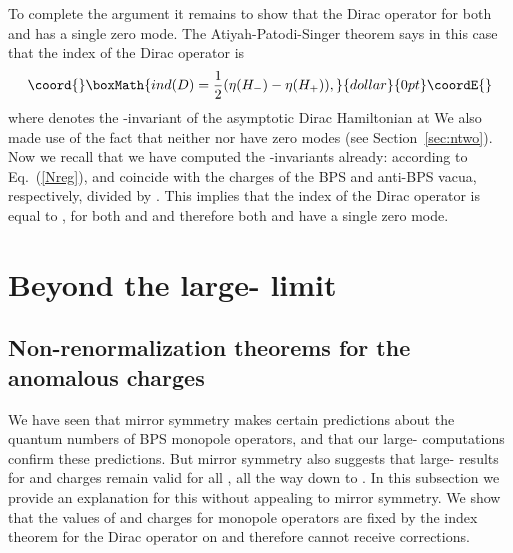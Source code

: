 \documentclass[a4paper,12pt, amsfonts, amssymb]{article}
\providecommand{\RR}{{\mathbb R}}
\renewcommand{\SS}{{\mathbb S}}
\providecommand{\ra}{\rightarrow}
\providecommand{\tpsi}{{\tilde \psi}}
\begin{document}
To complete the argument it remains to show that the Dirac operator for both
\myHighlight{$\psi$}\coordHE{} and \myHighlight{$\tpsi$}\coordHE{} has a single zero mode. The Atiyah-Patodi-Singer
theorem says in this case that the \coordHE{} index of the Dirac operator is
$$\coord{}\boxMath{
ind(D)=\frac{1}{2}(\eta(H_-)-\eta(H_+)),
}{dollar}{0pt}\coordE{}$$
where \coordHE{} denotes the \myHighlight{$\eta$}\coordHE{}-invariant of the asymptotic
Dirac Hamiltonian at \myHighlight{$\tau\ra \pm \infty.$}\coordHE{} We also made use of the fact
that neither \coordHE{} nor \coordHE{} have zero modes (see Section~\ref{sec:ntwo}). 
Now we recall that we have computed the \myHighlight{$\eta$}\coordHE{}-invariants already:
according to Eq.~(\ref{Nreg}), \coordHE{} and \coordHE{} coincide with the \coordHE{} charges of the BPS and anti-BPS vacua, respectively, 
divided by \coordHE{}. This implies that the index of the Dirac operator is 
equal to \coordHE{}, for both \myHighlight{$\psi$}\coordHE{} and \myHighlight{$\tpsi,$}\coordHE{} and therefore both \myHighlight{$\psi$}\coordHE{} 
and \myHighlight{$\tpsi$}\coordHE{} have a single zero mode.

\section{Beyond the large-\coordHE{} limit}\label{sec:finitenf}

\subsection{Non-renormalization theorems for the anomalous charges}

We have seen that mirror symmetry makes certain predictions about
the quantum numbers of BPS monopole operators, and that our large-\coordHE{}
computations confirm these predictions. But mirror symmetry also
suggests that large-\coordHE{} results for \coordHE{} and \coordHE{} charges
remain valid for all \coordHE{}, all the way down to \coordHE{}.
In this subsection we provide an explanation for this without appealing
to mirror symmetry. We show that the values of \coordHE{} and \coordHE{}
charges for monopole operators are fixed by the \coordHE{} index
theorem for the Dirac operator on \myHighlight{$\SS^2\times\RR$}\coordHE{} and therefore cannot
receive \coordHE{} corrections. 
\end{document}
